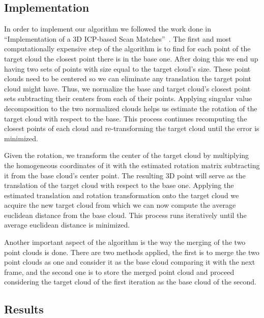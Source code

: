 \subsection{Implementation}
In order to implement our algorithm we followed the work done in ``Implementation of a 3D ICP-based Scan Matches''~\cite{icpImp}. The first and most computationally expensive step of the algorithm is to find for each point of the target cloud the closest point there is in the base one. After doing this we end up having two sets of points with size equal to the target cloud's size. These point clouds need to be centered so we can eliminate any translation the target point cloud might have. Thus, we normalize the base and target cloud's closest point sets subtracting their centers from each of their points. Applying singular value decomposition to the two normalized clouds helps us estimate the rotation of the target cloud with respect to the base. This process continues recomputing the closest points of each cloud and re-transforming the target cloud until the error is minimized.

Given the rotation, we transform the center of the target cloud by multiplying the homogeneous coordinates of it with the estimated rotation matrix subtracting it from the base cloud's center point. The resulting 3D point will serve as the translation of the target cloud with respect to the base one. Applying the estimated translation and rotation transformation onto the target cloud we acquire the new target cloud from which we can now compute the average euclidean distance from the base cloud. This process runs iteratively until the average euclidean distance is minimized.

Another important aspect of the algorithm is the way the merging of the two point clouds is done. There are two methods applied, the first is to merge the two point clouds as one and consider it as the base cloud comparing it with the next frame, and the second one is to store the merged point cloud and proceed considering the target cloud of the first iteration as the base cloud of the second.


\subsection{Results}

